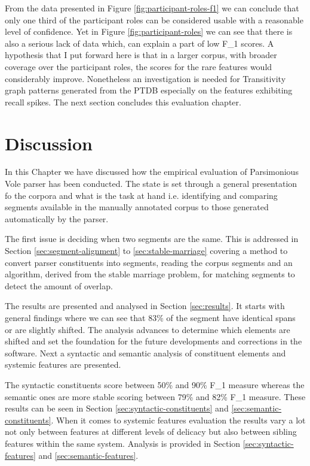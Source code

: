 From the data presented in Figure \ref{fig:participant-roles-f1} we can conclude that only one third of the participant roles can be considered usable with a reasonable level of confidence. Yet in Figure \ref{fig:participant-roles} we can see that there is also a serious lack of data which, can explain a part of low F_1 scores. A hypothesis that I put forward here is that in a larger corpus, with broader coverage over the participant roles, the scores for the rare features would considerably improve. Nonetheless an investigation is needed for Transitivity graph patterns generated from the PTDB especially on the features exhibiting recall spikes. The next section concludes this evaluation chapter.

\section{Discussion}
\label{sec:evaluation-discussion}
In this Chapter we have discussed how the empirical evaluation of Parsimonious Vole parser has been conducted. 
The state is set through a general presentation fo the corpora and what is the task at hand i.e. identifying and comparing segments available in the manually annotated corpus to those generated automatically by the parser. 

The first issue is deciding when two segments are the same. This is addressed in Section \ref{sec:segment-alignment} to \ref{sec:stable-marriage} covering a method to convert parser constituents into segments, reading the corpus segments and an algorithm, derived from the stable marriage problem, for matching segments  to detect the amount of overlap.

The results are presented and analysed in Section \ref{sec:results}. It starts with general findings where we can see that 83\% of the segment have identical spans or are slightly shifted. The analysis advances to determine which elements are shifted and set the foundation for the future developments and corrections in the software. Next a syntactic and semantic analysis of constituent elements and systemic features are presented. 

The syntactic constituents score between 50\% and 90\% F_1 measure whereas the semantic ones are more stable scoring between 79\% and 82\% F_1 measure. These results can be seen in Section \ref{sec:syntactic-constituents} and \ref{sec:semantic-constituents}. When it comes to systemic features evaluation the results vary a lot not only between features at different levels of delicacy but also between sibling features within the same system. Analysis is provided in Section \ref{sec:syntactic-features} and \ref{sec:semantic-features}.

